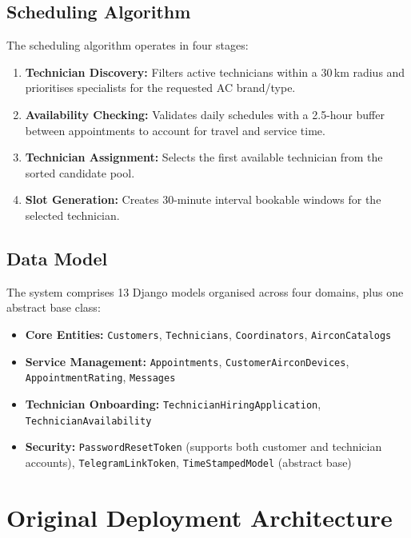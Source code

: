 \documentclass[conference]{IEEEtran}
\begin{document}
\subsection{Scheduling Algorithm}

The scheduling algorithm operates in four stages:

\begin{enumerate}
    \item \textbf{Technician Discovery:} Filters active technicians within a 30\,km radius and prioritises specialists for the requested AC brand/type.
    \item \textbf{Availability Checking:} Validates daily schedules with a 2.5-hour buffer between appointments to account for travel and service time.
    \item \textbf{Technician Assignment:} Selects the first available technician from the sorted candidate pool.
    \item \textbf{Slot Generation:} Creates 30-minute interval bookable windows for the selected technician.
\end{enumerate}

\subsection{Data Model}

The system comprises 13 Django models organised across four domains, plus one abstract base class:

\begin{itemize}
    \item \textbf{Core Entities:} \texttt{Customers}, \texttt{Technicians}, \texttt{Coordinators}, \texttt{AirconCatalogs}
    \item \textbf{Service Management:} \texttt{Appointments}, \texttt{CustomerAirconDevices}, \texttt{AppointmentRating}, \texttt{Messages}
    \item \textbf{Technician Onboarding:} \texttt{TechnicianHiringApplication}, \texttt{TechnicianAvailability}
    \item \textbf{Security:} \texttt{PasswordResetToken} (supports both customer and technician accounts), \texttt{TelegramLinkToken}, \texttt{TimeStampedModel} (abstract base)
\end{itemize}

\section{Original Deployment Architecture}
\end{document}
